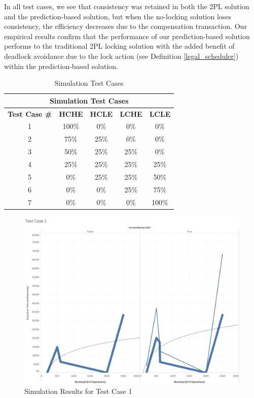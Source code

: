In all test cases, we see that consistency was retained in both the 2PL solution and the prediction-based solution, but when the no-locking solution loses consistency, the efficiency decreases due to the compensation transaction. Our empirical results confirm that the performance of our prediction-based solution performs to the traditional 2PL locking solution with the added benefit of deadlock avoidance due to the lock action (see Definition \ref{legal_scheduler}) within the prediction-based solution.

\begin{table}[h]
\captionsetup{justification=centering}
\centering
\begin{tabular}{|c|c|c|c|c|}
\hline
\multicolumn{5}{|c|}{\cellcolor[HTML]{EFEFEF}\textbf{Simulation Test Cases}}                                                   \\ \hline
\textbf{Test Case \#} & \textbf{HCHE} & \textbf{HCLE} & \textbf{LCHE} & \textbf{LCLE} \\ \hline
1 & 100\% & 0\% & 0\% & 0\% \\ \hline
2 & 75\% & 25\% & 0\% & 0\% \\ \hline
3 & 50\% & 25\% & 25\% & 0\% \\ \hline
4 & 25\% & 25\% & 25\% & 25\% \\ \hline
5 & 0\% & 25\% & 25\% & 50\% \\ \hline
6 & 0\% & 0\% & 25\% & 75\% \\ \hline
7 & 0\% & 0\% & 0\% & 100\% \\ \hline
\end{tabular}

\caption{Simulation Test Cases} %
\label{tbl:sim_test_cases} %

\end{table}

\begin{figure}
\centering
\includegraphics[scale=0.23]{images/TestCase1(WL).png}
\caption{Simulation Results for Test Case 1}
\label{results:test_case_graphs_1}
\end{figure}

